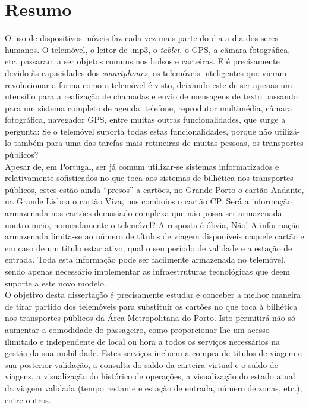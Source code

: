 \chapter*{Resumo}

O uso de dispositivos móveis faz cada vez mais parte do dia-a-dia dos seres humanos. O telemóvel, o leitor de .mp3, o \textit{tablet}, o GPS, a câmara fotográfica, etc. passaram a ser objetos comuns nos bolsos e carteiras. E é precisamente devido às capacidades dos \textit{smartphones}, os telemóveis inteligentes que vieram revolucionar a forma como o telemóvel é visto, deixando este de ser apenas um utensílio para a realização de chamadas e envio de mensagens de texto passando para um sistema completo de agenda, telefone, reprodutor multimédia, câmara fotográfica, navegador GPS, entre muitas outras funcionalidades, que surge a pergunta: Se o telemóvel suporta todas estas funcionalidades, porque não utilizá-lo também para uma das tarefas mais rotineiras de muitas pessoas, os transportes públicos?
\\Apesar de, em Portugal, ser já comum utilizar-se sistemas informatizados e relativamente sofisticados no que toca aos sistemas de bilhética nos transportes públicos, estes estão ainda “presos” a cartões, no Grande Porto o cartão Andante, na Grande Lisboa o cartão Viva, nos comboios o cartão CP. Será a informação armazenada nos cartões demasiado complexa que não possa ser armazenada noutro meio, nomeadamente o telemóvel? A resposta é óbvia, Não! A informação armazenada limita-se ao número de títulos de viagem disponíveis naquele cartão e em caso de um título estar ativo, qual o seu período de validade e a estação de entrada. Toda esta informação pode ser facilmente armazenada no telemóvel, sendo apenas necessário implementar as infraestruturas tecnológicas que deem suporte a este novo modelo.
\\O objetivo desta dissertação é precisamente estudar e conceber a melhor maneira de tirar partido dos telemóveis para substituir os cartões no que toca à bilhética nos transportes públicos da Área Metropolitana do Porto. Isto permitirá não só aumentar a comodidade do passageiro, como proporcionar-lhe um acesso ilimitado e independente de local ou hora a todos os serviços necessários na gestão da sua mobilidade. Estes serviços incluem a compra de títulos de viagem e sua posterior validação, a consulta do saldo da carteira virtual e o saldo de viagens, a visualização do histórico de operações, a visualização do estado atual da viagem validada (tempo restante e estação de entrada, número de zonas, etc.), entre outros.
